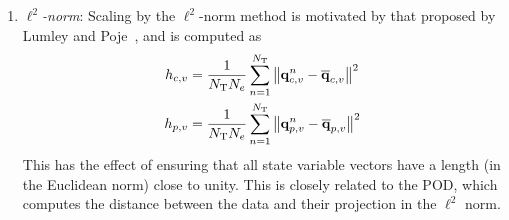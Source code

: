 \begin{enumerate}
	\item $\ell^2$\textit{-norm}: Scaling by the $\ell^2$-norm method is motivated by that proposed by Lumley and Poje~\cite{Lumley1997}, and is computed as
	\begin{align}
		h_{c,v} &= \frac{1}{N_{\text{T}} N_{e}} \sum_{n=1}^{N_{\text{T}}} \left\Vert \mathbf{q}_{c,v}^{n} - \mathbf{\overline{q}}_{c,v} \right\Vert^2 \\
		h_{p,v} &= \frac{1}{N_{\text{T}} N_{e}} \sum_{n=1}^{N_{\text{T}}} \left\Vert \mathbf{q}_{p,v}^{n} - \mathbf{\overline{q}}_{p,v} \right\Vert^2
	\end{align}
	This has the effect of ensuring that all state variable vectors have a length (in the Euclidean norm) close to unity. This is closely related to the POD, which computes the distance between the data and their projection in the $\ell^2$ norm.


\end{enumerate}
